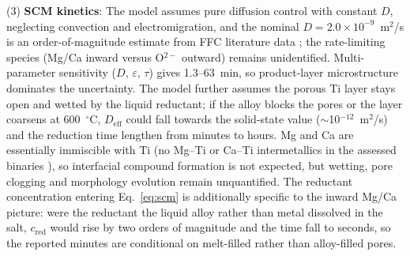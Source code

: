 \documentclass[pdflatex,sn-basic,Numbered]{sn-jnl}
\begin{document}
(3) \textbf{SCM kinetics}: The model assumes pure diffusion control with constant $D$, neglecting convection and electromigration, and the nominal $D = 2.0\times10^{-9}$~m$^2$/s is an order-of-magnitude estimate from FFC literature data \cite{fray2000,yan2007}; the rate-limiting species (Mg/Ca inward versus O$^{2-}$ outward) remains unidentified. Multi-parameter sensitivity ($D$, $\varepsilon$, $\tau$) gives 1.3--63~min, so product-layer microstructure dominates the uncertainty. The model further assumes the porous Ti layer stays open and wetted by the liquid reductant; if the alloy blocks the pores or the layer coarsens at 600~$^{\circ}$C, $D_{\mathrm{eff}}$ could fall towards the solid-state value ($\sim$10$^{-12}$~m$^2$/s) and the reduction time lengthen from minutes to hours. Mg and Ca are essentially immiscible with Ti (no Mg--Ti or Ca--Ti intermetallics in the assessed binaries \cite{hallstedt2025}), so interfacial compound formation is not expected, but wetting, pore clogging and morphology evolution remain unquantified. The reductant concentration entering Eq.~\ref{eq:scm} is additionally specific to the inward Mg/Ca picture: were the reductant the liquid alloy rather than metal dissolved in the salt, $c_{\mathrm{red}}$ would rise by two orders of magnitude and the time fall to seconds, so the reported minutes are conditional on melt-filled rather than alloy-filled pores.
\end{document}
